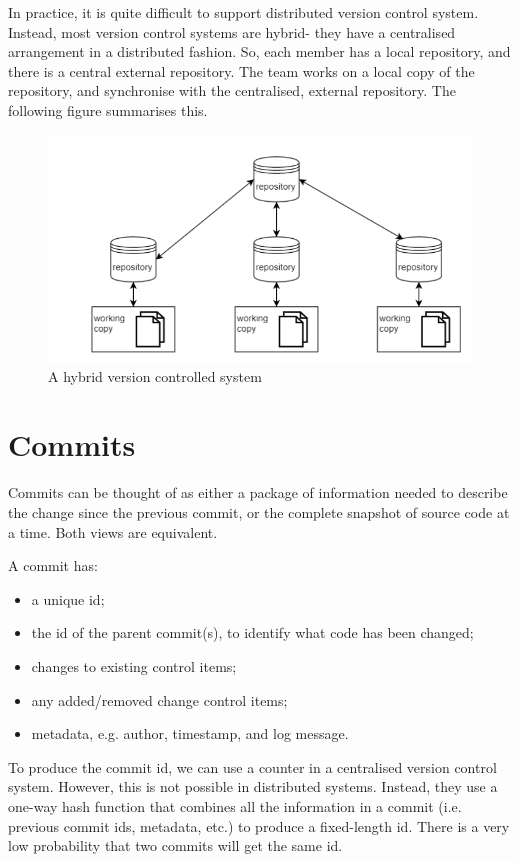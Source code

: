 \documentclass[a4paper, openany]{memoir}
\begin{document}
In practice, it is quite difficult to support distributed version control system. Instead, most version control systems are hybrid- they have a centralised arrangement in a distributed fashion. So, each member has a local repository, and there is a central external repository. The team works on a local copy of the repository, and synchronise with the centralised, external repository. The following figure summarises this.
\begin{figure}[H]
    \centering
    \includegraphics[scale=0.65]{src/3.7 In practice.png}
    \caption{A hybrid version controlled system}
\end{figure}

\section{Commits}
Commits can be thought of as either a package of information needed to describe the change since the previous commit, or the complete snapshot of source code at a time. Both views are equivalent.

A commit has:
\begin{itemize}
    \item a unique id;
    \item the id of the parent commit(s), to identify what code has been changed;
    \item changes to existing control items;
    \item any added/removed change control items;
    \item metadata, e.g. author, timestamp, and log message.
\end{itemize}

To produce the commit id, we can use a counter in a centralised version control system. However, this is not possible in distributed systems. Instead, they use a one-way hash function that combines all the information in a commit (i.e. previous commit ids, metadata, etc.) to produce a fixed-length id. There is a very low probability that two commits will get the same id.
\end{document}
